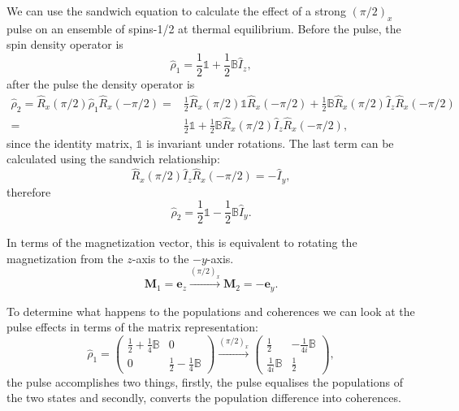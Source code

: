 We can use the sandwich equation to calculate the effect of a strong $(\pi/2)_x$ pulse
on an ensemble of spins-1/2 at thermal equilibrium.
Before the pulse, the spin density operator is
\begin{equation}
  \hat{\rho}_1 = \frac{1}{2}\mathbb{1} + \frac{1}{2}\mathbb{B}\hat{I}_z,
\end{equation}
after the pulse the density operator is
\begin{align}
  \hat{\rho}_2 = \hat{R}_x(\pi/2)\hat{\rho}_1\hat{R}_x(-\pi/2) =& \frac{1}{2}\hat{R}_x(\pi/2)\mathbb{1}\hat{R}_x(-\pi/2) + \frac{1}{2}\mathbb{B}\hat{R}_x(\pi/2)\hat{I}_z\hat{R}_x(-\pi/2) \\
  =& \frac{1}{2}\mathbb{1} + \frac{1}{2}\mathbb{B}\hat{R}_x(\pi/2)\hat{I}_z\hat{R}_x(-\pi/2),
\end{align}
since the identity matrix, $\mathbb{1}$ is invariant under rotations. The last term
can be calculated using the sandwich relationship:
\begin{equation}
  \hat{R}_x(\pi/2)\hat{I}_z\hat{R}_x(-\pi/2) = -\hat{I}_y,
\end{equation}
therefore
\begin{equation}
  \hat{\rho}_2 = \frac{1}{2}\mathbb{1} - \frac{1}{2}\mathbb{B}\hat{I}_y.
\end{equation}

In terms of the magnetization vector, this is equivalent to rotating
the magnetization from the $z$-axis to the $-y$-axis.
\begin{equation}
  \mathbf{M}_1 = \mathbf{e}_z \xrightarrow{(\pi/2)_x} \mathbf{M}_2 = -\mathbf{e}_y.
\end{equation}

To determine what happens to the populations and coherences we can look at the
pulse effects in terms of the matrix representation:
\begin{equation}
  \hat{\rho}_1 = \begin{pmatrix}
    \frac{1}{2} + \frac{1}{4}\mathbb{B} & 0\\
    0 & \frac{1}{2} - \frac{1}{4}\mathbb{B}
\end{pmatrix}\xrightarrow{(\pi/2)_x}\begin{pmatrix}
  \frac{1}{2} & -\frac{1}{4i}\mathbb{B}\\
  \frac{1}{4i}\mathbb{B} & \frac{1}{2}
\end{pmatrix},
\end{equation}
the pulse accomplishes two things, firstly, the pulse equalises the populations of the
two states and secondly, converts the population difference into coherences.

